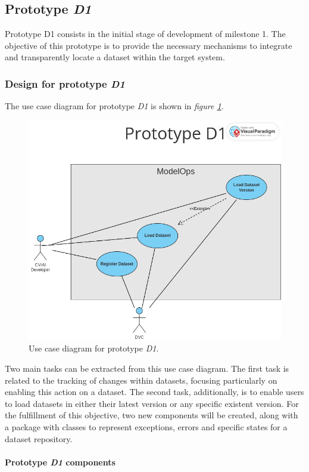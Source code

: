 \subsection{Prototype \emph{D1}}

Prototype D1 consists in the initial stage of development of milestone 1. The objective of this prototype is to 
provide the necessary mechanisms to integrate and transparently locate a dataset within the target system.

\subsubsection{Design for prototype \emph{D1}}

The use case diagram for prototype \emph{D1} is shown in \emph{figure \ref{fig:useCaseD1}}.

\begin{figure}[H]
    \centering
    \includegraphics[width=0.7\linewidth]{figs/use-case-D1.png}
    \caption{Use case diagram for prototype \emph{D1}.}
    \label{fig:useCaseD1}
\end{figure}

Two main tasks can be extracted from this use case diagram. The first task is related to the tracking of changes within datasets, focusing particularly on enabling this action on a 
dataset. The second task, additionally, is to enable users to load datasets in either their latest version or any specific existent version. For the fulfillment of 
this objective, two new components will be created, along with a package with classes to represent exceptions, errors and specific states for a dataset repository.

\paragraph{Prototype \emph{D1} components}

